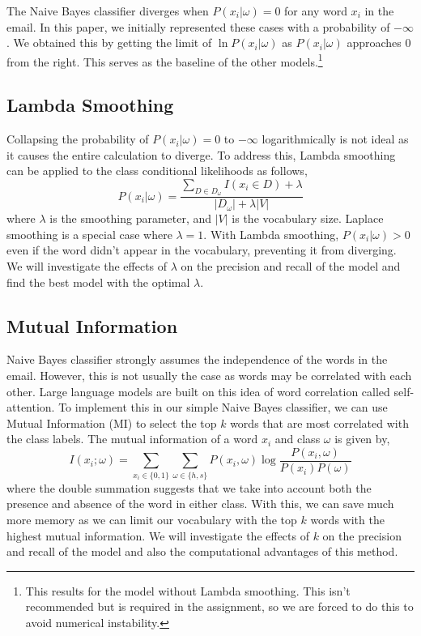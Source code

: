 \documentclass{acm_proc_article-sp}
\begin{document}
The Naive Bayes classifier diverges when $P(x_i|\omega) = 0$ for any word $x_i$ in the email. In this paper, we initially represented these cases with a probability of $-\infty$. We obtained this by getting the limit of $\ln{P(x_i|\omega)}$ as $P(x_i|\omega)$ approaches 0 from the right. This serves as the baseline of the other models.\footnote{This results for the model without Lambda smoothing. This isn't recommended but is required in the assignment, so we are forced to do this to avoid numerical instability.}
\subsection{Lambda Smoothing}
Collapsing the probability of $P(x_i|\omega) = 0$ to $-\infty$ logarithmically is not ideal as it causes the entire calculation to diverge. To address this, Lambda smoothing can be applied to the class conditional likelihoods as follows,
\begin{equation}
    P(x_i|\omega) = \frac{\sum_{D\in D_\omega} I(x_i\in D) + \lambda}{|D_\omega| + \lambda |V|}
\end{equation}
where $\lambda$ is the smoothing parameter, and $|V|$ is the vocabulary size. Laplace smoothing is a special case where $\lambda = 1$. With Lambda smoothing, $P(x_i|\omega) > 0$ even if the word didn't appear in the vocabulary, preventing it from diverging. We will investigate the effects of $\lambda$ on the precision and recall of the model and find the best model with the optimal $\lambda$.

\subsection{Mutual Information}
Naive Bayes classifier strongly assumes the independence of the words in the email. However, this is not usually the case as words may be correlated with each other. Large language models are built on this idea of word correlation called self-attention. To implement this in our simple Naive Bayes classifier, we can use Mutual Information (MI) to select the top $k$ words that are most correlated with the class labels. The mutual information of a word $x_i$ and class $\omega$ is given by,
\begin{equation}
    I(x_i; \omega) = \sum_{x_i\in\{0, 1\}}\sum_{\omega\in\{h, s\}} P(x_i, \omega) \log\frac{P(x_i, \omega)}{P(x_i)P(\omega)}
\end{equation}
where the double summation suggests that we take into account both the presence and absence of the word in either class. With this, we can save much more memory as we can limit our vocabulary with the top $k$ words with the highest mutual information. We will investigate the effects of $k$ on the precision and recall of the model and also the computational advantages of this method.
\end{document}
